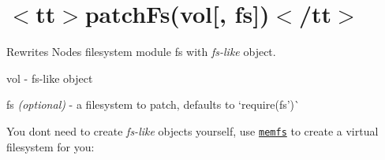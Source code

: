 \chapter{\texorpdfstring{$<$}{<}tt\texorpdfstring{$>$}{>}patch\+Fs(vol\mbox{[}, fs\mbox{]})\texorpdfstring{$<$}{<}/tt\texorpdfstring{$>$}{>}}
\hypertarget{md__d_1_2_g_i_t_2_food_link_2foodlink_8client_2node__modules_2fs-monkey_2docs_2api_2patch_fs}{}\label{md__d_1_2_g_i_t_2_food_link_2foodlink_8client_2node__modules_2fs-monkey_2docs_2api_2patch_fs}
\label{md__d_1_2_g_i_t_2_food_link_2foodlink_8client_2node__modules_2fs-monkey_2docs_2api_2patch_fs_autotoc_md8325}%
%


Rewrites Node\textquotesingle{}s filesystem module {\ttfamily fs} with {\itshape fs-\/like} object.


\begin{DoxyItemize}
\item {\ttfamily vol} -\/ fs-\/like object
\item {\ttfamily fs} {\itshape (optional)} -\/ a filesystem to patch, defaults to `require(\textquotesingle{}fs')\`{}
\end{DoxyItemize}


\begin{DoxyCode}{0}
\DoxyCodeLine{}
\DoxyCodeLine{\};}
\DoxyCodeLine{}

\end{DoxyCode}


You don\textquotesingle{}t need to create {\itshape fs-\/like} objects yourself, use \href{https://github.com/streamich/memfs}{\texttt{ {\ttfamily memfs}}} to create a virtual filesystem for you\+:


\begin{DoxyCode}{0}
\DoxyCodeLine{}

\end{DoxyCode}
 